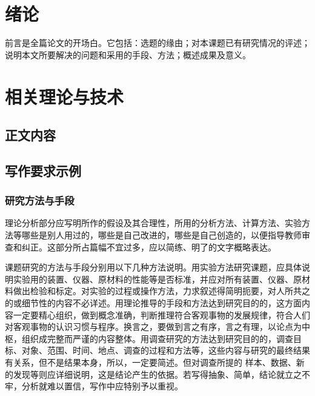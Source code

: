 \xfbody

\chapter{绪论}

前言是全篇论文的开场白。它包括：选题的缘由；对本课题已有研究情况的评述；说明本文所要解决的问题和采用的手段、方法；概述成果及意义。

\chapter{相关理论与技术}


\section{正文内容}


\section{写作要求示例}

\subsection{研究方法与手段}



理论分析部分应写明所作的假设及其合理性，所用的分析方法、计算方法、实验方法等哪些是别人用过的，哪些是自己改进的，哪些是自己创造的，以便指导教师审查和纠正。这部分所占篇幅不宜过多，应以简练、明了的文字概略表达。

课题研究的方法与手段分别用以下几种方法说明。用实验方法研究课题，应具体说明实验用的装置、仪器、原材料的性能等是否标准，并应对所有装置、仪器、原材料做出检验和标定。对实验的过程或操作方法，力求叙述得简明扼要，对人所共之的或细节性的内容不必详述。用理论推导的手段和方法达到研究目的的，这方面内容一定要精心组织，做到概念准确，判断推理符合客观事物的发展规律，符合人们对客观事物的认识习惯与程序。换言之，要做到言之有序，言之有理，以论点为中枢，组织成完整而严谨的内容整体。用调查研究的方法达到研究目的的，调查目标、对象、范围、时间、地点、调查的过程和方法等，这些内容与研究的最终结果有关系，但不是结果本身，所以，一定要简述。但对调查所提的 样本、数据、新的发现等则应详细说明，这是结论产生的依据。若写得抽象、简单，结论就立之不牢，分析就难以置信，写作中应特别予以重视。

